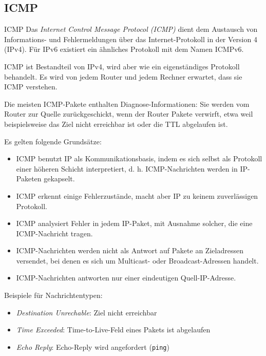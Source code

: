 \subsection{ICMP}

\begin{defi}{ICMP}
    Das \emph{Internet Control Message Protocol (ICMP)} dient dem Austausch von Informations- und Fehlermeldungen über das Internet-Protokoll in der Version 4 (IPv4). Für IPv6 existiert ein ähnliches Protokoll mit dem Namen ICMPv6.

    ICMP ist Bestandteil von IPv4, wird aber wie ein eigenständiges Protokoll behandelt.
    Es wird von jedem Router und jedem Rechner erwartet, dass sie ICMP verstehen.

    Die meisten ICMP-Pakete enthalten Diagnose-Informationen: Sie werden vom Router zur Quelle zurückgeschickt, wenn der Router Pakete verwirft, etwa weil beispielsweise das Ziel nicht erreichbar ist oder die TTL abgelaufen ist.

    Es gelten folgende Grundsätze:
    \begin{itemize}
        \item ICMP benutzt IP als Kommunikationsbasis, indem es sich selbst als Protokoll einer höheren Schicht interpretiert, d. h. ICMP-Nachrichten werden in IP-Paketen gekapselt.
        \item ICMP erkennt einige Fehlerzustände, macht aber IP zu keinem zuverlässigen Protokoll.
        \item ICMP analysiert Fehler in jedem IP-Paket, mit Ausnahme solcher, die eine ICMP-Nachricht tragen.
        \item ICMP-Nachrichten werden nicht als Antwort auf Pakete an Zieladressen versendet, bei denen es sich um Multicast- oder Broadcast-Adressen handelt.
        \item ICMP-Nachrichten antworten nur einer eindeutigen Quell-IP-Adresse.
    \end{itemize}

    Beispiele für Nachrichtentypen:
    \begin{itemize}
        \item \emph{Destination Unrechable}: Ziel nicht erreichbar
        \item \emph{Time Exceeded}: Time-to-Live-Feld eines Pakets ist abgelaufen
        \item \emph{Echo Reply}: Echo-Reply wird angefordert (\texttt{ping})
    \end{itemize}
\end{defi}

